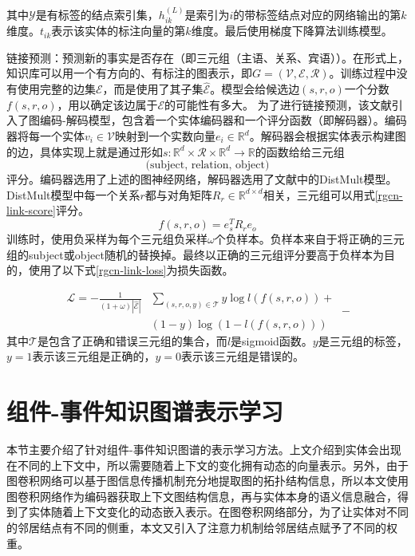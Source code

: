 其中$\mathcal{Y}$是有标签的结点索引集，$h_{i k}^{(L)}$是索引为$i$的带标签结点对应的网络输出的第$k$维度。$t_{i k}$表示该实体的标注向量的第$k$维度。最后使用梯度下降算法训练模型。

链接预测：预测新的事实是否存在（即三元组（主语、关系、宾语））。在形式上，知识库可以用一个有方向的、有标注的图表示，即$G=(\mathcal{V}, \mathcal{E}, \mathcal{R})$。训练过程中没有使用完整的边集$\mathcal{E}$，而是使用了其子集$\hat{\mathcal{E}}$。模型会给候选边$(s, r, o)$一个分数$f(s, r, o)$，用以确定该边属于$\mathcal{E}$的可能性有多大。
为了进行链接预测，该文献引入了图编码-解码模型，包含着一个实体编码器和一个评分函数（即解码器）。编码器将每一个实体$v_{i} \in \mathcal{V}$映射到一个实数向量$e_{i} \in \mathbb{R}^{d}$。解码器会根据实体表示构建图的边，具体实现上就是通过形如$s: \mathbb{R}^{d} \times \mathcal{R} \times \mathbb{R}^{d} \rightarrow \mathbb{R}$的函数给给三元组$$\text { (subject, relation, object) }$$评分。编码器选用了上述的图神经网络，解码器选用了文献\parencite{yang2014embedding}中的DistMult模型。DistMult模型中每一个关系$r$都与对角矩阵$R_{r} \in \mathbb{R}^{d \times d}$相关，三元组可以用式\ref{rgcn-link-score}评分。
\begin{equation}
    f(s, r, o)=e_{s}^{T} R_{r} e_{o}
    \label{rgcn-link-score}
\end{equation}
训练时，使用负采样为每个三元组负采样$\omega$个负样本。负样本来自于将正确的三元组的subject或object随机的替换掉。最终以正确的三元组评分要高于负样本为目的，使用了以下式\ref{rgcn-link-loss}为损失函数。

\begin{equation}
    \begin{aligned}
        \mathcal{L}=-\frac{1}{(1+\omega)|\hat{\mathcal{E}}|} & \sum_{(s, r, o, y) \in \mathcal{T}} y \log l(f(s, r, o))+\\
        &(1-y) \log (1-l(f(s, r, o)))
        \end{aligned}-
    \label{rgcn-link-loss}
\end{equation}
其中$\mathcal{T}$是包含了正确和错误三元组的集合，而$l$是sigmoid函数。$y$是三元组的标签，$y=1$表示该三元组是正确的，$y=0$表示该三元组是错误的。

\section{组件-事件知识图谱表示学习}
本节主要介绍了针对组件-事件知识图谱的表示学习方法。上文介绍到实体会出现在不同的上下文中，所以需要随着上下文的变化拥有动态的向量表示。另外，由于图卷积网络可以基于图信息传播机制充分地提取图的拓扑结构信息，所以本文使用图卷积网络作为编码器获取上下文图结构信息，再与实体本身的语义信息融合，得到了实体随着上下文变化的动态嵌入表示。在图卷积网络部分，为了让实体对不同的邻居结点有不同的侧重，本文又引入了注意力机制给邻居结点赋予了不同的权重。
